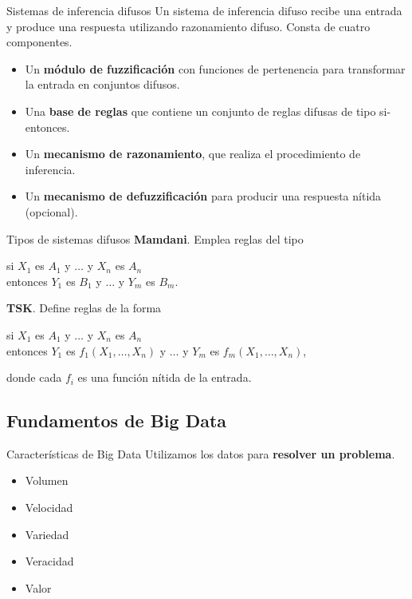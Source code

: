\documentclass[10pt, spanish]{beamer}
\begin{document}
\begin{frame}{Sistemas de inferencia difusos}
	Un sistema de inferencia difuso recibe una entrada y produce una respuesta utilizando razonamiento difuso. Consta de cuatro componentes.

	\begin{itemize}
	\item Un \textbf{módulo de fuzzificación} con funciones de pertenencia para transformar la entrada en conjuntos difusos.
	\item Una \textbf{base de reglas} que contiene un conjunto de reglas difusas de tipo si-entonces.
	\item Un \textbf{mecanismo de razonamiento}, que realiza el procedimiento de inferencia.
  \item Un \textbf{mecanismo de defuzzificación} para producir una respuesta nítida (opcional).
\end{itemize}

\end{frame}

\begin{frame}{Tipos de sistemas difusos}
\textbf{Mamdani}. Emplea reglas del tipo
  \begin{center}
  si $X_1$ es $A_1$ y $\dots$ y $X_n$ es $A_n$\\
  entonces $Y_1$ es $B_1$ y $\dots$ y $Y_m$ es $B_m$.
\end{center}
\vspace{1em}

\textbf{TSK}. Define reglas de la forma
\begin{center}
  si $X_1$ es $A_1$ y $\dots$ y $X_n$ es $A_n$\\
  entonces $Y_1$ es $f_1(X_1, \dots, X_n)$ y $\dots$ y $Y_m$ es $f_m(X_1, \dots, X_n)$,
\end{center}
    donde cada $f_i$ es una función nítida de la entrada.

\end{frame}

\subsection{Fundamentos de Big Data}

\begin{frame}{Características de Big Data}
  Utilizamos los datos para \textbf{resolver un problema}.

\begin{itemize}
  \item Volumen
  \item Velocidad
  \item Variedad
  \item Veracidad
  \item Valor
\end{itemize}
\end{frame}
\end{document}
